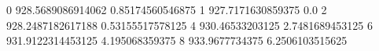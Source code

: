 0 928.5689086914062 0.85174560546875
1 927.7171630859375 0.0
2 928.2487182617188 0.53155517578125
4 930.46533203125 2.7481689453125
6 931.9122314453125 4.195068359375
8 933.9677734375 6.2506103515625
